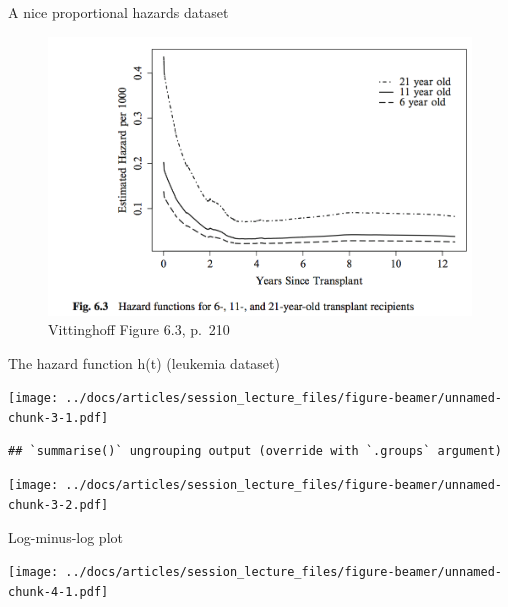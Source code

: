 \documentclass[
  ignorenonframetext,
]{beamer}
\begin{document}
\begin{frame}{A nice proportional hazards dataset}
\protect\hypertarget{a-nice-proportional-hazards-dataset}{}

\begin{figure}
\centering
\includegraphics{figures/vittinghofffig63.png}
\caption{Vittinghoff Figure 6.3, p.~210}
\end{figure}

\end{frame}

\begin{frame}[fragile]{The hazard function h(t) (leukemia dataset)}
\protect\hypertarget{the-hazard-function-ht-leukemia-dataset}{}

\texttt{[image: ../docs/articles/session\_lecture\_files/figure-beamer/unnamed-chunk-3-1.pdf]}

\begin{verbatim}
## `summarise()` ungrouping output (override with `.groups` argument)
\end{verbatim}

\texttt{[image: ../docs/articles/session\_lecture\_files/figure-beamer/unnamed-chunk-3-2.pdf]}

\end{frame}

\begin{frame}{Log-minus-log plot}
\protect\hypertarget{log-minus-log-plot}{}

\texttt{[image: ../docs/articles/session\_lecture\_files/figure-beamer/unnamed-chunk-4-1.pdf]}

\end{frame}
\end{document}
